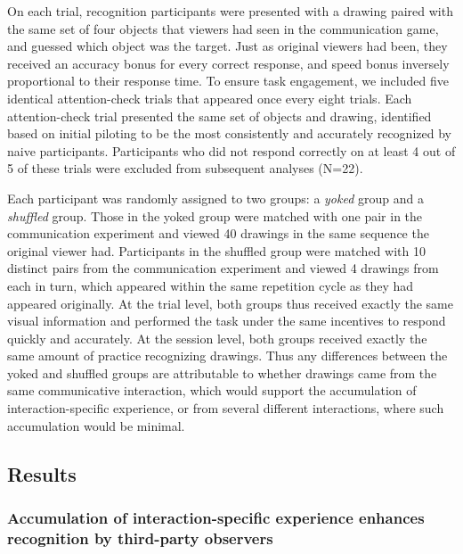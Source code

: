 \documentclass[10pt,letterpaper]{article}
\begin{document}
On each trial, recognition participants were presented with a drawing paired with the same set of four objects that viewers had seen in the communication game, and guessed which object was the target.
Just as original viewers had been, they received an accuracy bonus for every correct response, and speed bonus inversely proportional to their response time.
To ensure task engagement, we included five identical attention-check trials that appeared once every eight trials.
Each attention-check trial presented the same set of objects and drawing, identified based on initial piloting to be the most consistently and accurately recognized by naive participants.
Participants who did not respond correctly on at least 4 out of 5 of these trials were excluded from subsequent analyses (N=22).

Each participant was randomly assigned to two groups: a \textit{yoked} group and a \textit{shuffled} group.
Those in the yoked group were matched with one pair in the communication experiment and viewed 40 drawings in the same sequence the original viewer had.
Participants in the shuffled group were matched with 10 distinct pairs from the communication experiment and viewed 4 drawings from each in turn, which appeared within the same repetition cycle as they had appeared originally.
At the trial level, both groups thus received exactly the same visual information and performed the task under the same incentives to respond quickly and accurately.
At the session level, both groups received exactly the same amount of practice recognizing drawings.
Thus any differences between the yoked and shuffled groups are attributable to whether drawings came from the same communicative interaction, which would support the accumulation of interaction-specific experience, or from several different interactions, where such accumulation would be minimal.

\subsection{Results}

\subsubsection{Accumulation of interaction-specific experience enhances recognition by third-party observers}

\end{document}
